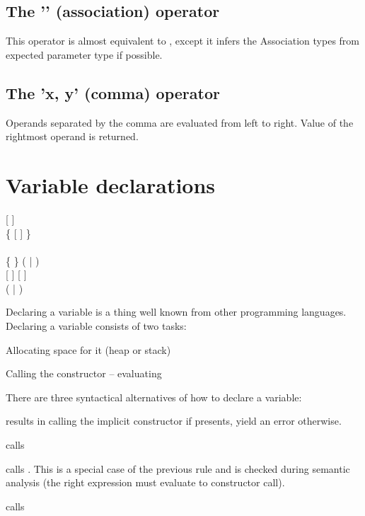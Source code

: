 \subsection{The '' (association) operator}
This operator is almost equivalent to , except it infers the Association types from expected parameter type if possible.

\subsection{The 'x, y' (comma) operator}
Operands separated by the comma are evaluated from left to right. Value of the rightmost operand is returned.

\pagebreak\section{Variable declarations}
\begin{grammar}
	   [  ] \\
		\grLn \{ \kwd{,}  [  ] \} \kwd{;} \\
	\\
	 \{  \} (  |  ) \\
	  [  ] [ \kwd{!} ] \\
	 ( \kwd{=} | \kwd{:=} )  \\
\end{grammar}

Declaring a variable is a thing well known from other programming languages. Declaring a variable consists of two tasks:
\begin{compactenum}
	\item Allocating space for it (heap or stack)
	\item Calling the constructor -- evaluating 
\end{compactenum}

There are three syntactical alternatives of how to declare a variable:
\begin{compactitem}
	\item {} results in calling the implicit constructor  if presents, yield an error otherwise.
	\item {} calls 
	\item {}  calls . This is a special case of the previous rule and is checked during semantic analysis (the right expression must evaluate to  constructor call).
	\item {} calls  %
\end{compactitem}

